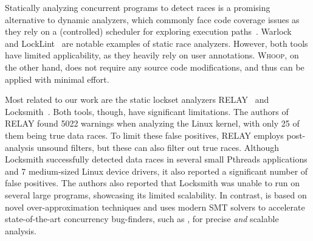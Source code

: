 Statically analyzing concurrent programs to detect races is a promising alternative to dynamic analyzers, which commonly face code coverage issues as they rely on a (controlled) scheduler for exploring execution paths~\cite{musuvathi2008finding}. Warlock~\cite{sterling1993warlock} and LockLint~\cite{oracle2010locklint} are notable examples of static race analyzers. However, both tools have limited applicability, as they heavily rely on user annotations. \textsc{Whoop}, on the other hand, does not require any source code modifications, and thus can be applied with minimal effort.

Most related to our work are the static lockset analyzers RELAY~\cite{voung2007relay} and Locksmith~\cite{pratikakis2006locksmith}. Both tools, though, have significant limitations. The authors of RELAY found 5022 warnings when analyzing the Linux kernel, with only 25 of them being true data races. To limit these false positives, RELAY employs post-analysis unsound filters, but these can also filter out true races. Although Locksmith successfully detected data races in several small Pthreads applications and 7 medium-sized Linux device drivers, it also reported a significant number of false positives. The authors also reported that Locksmith was unable to run on several large programs, showcasing its limited scalability. In contrast, \whoop is based on novel over-approximation techniques and uses modern SMT solvers to accelerate state-of-the-art concurrency bug-finders, such as \corral, for precise \emph{and} scalable analysis.
